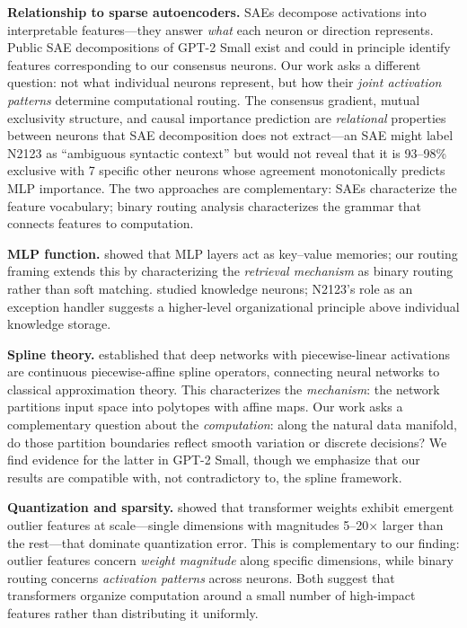 \documentclass{article}
\begin{document}
\textbf{Relationship to sparse autoencoders.}
SAEs \citep{bricken2023monosemanticity, cunningham2023sparse} decompose activations into
interpretable features---they answer \emph{what} each neuron or direction represents.
Public SAE decompositions of GPT-2 Small exist \citep{gao2024scaling, bloom2024residual}
and could in principle identify features corresponding to our consensus neurons.
Our work asks a different question: not what individual neurons represent, but how their
\emph{joint activation patterns} determine computational routing. The consensus gradient,
mutual exclusivity structure, and causal importance prediction are \emph{relational}
properties between neurons that SAE decomposition does not extract---an SAE might label
N2123 as ``ambiguous syntactic context'' but would not reveal that it is 93--98\% exclusive
with 7 specific other neurons whose agreement monotonically predicts MLP importance.
The two approaches are complementary: SAEs characterize the feature vocabulary; binary
routing analysis characterizes the grammar that connects features to computation.

\textbf{MLP function.}
\citet{geva2021transformer} showed that MLP layers act as key--value memories; our routing framing
extends this by characterizing the \emph{retrieval mechanism} as binary routing rather than
soft matching. \citet{dai2022knowledge} studied knowledge neurons; N2123's role as an exception
handler suggests a higher-level organizational principle above individual knowledge storage.

\textbf{Spline theory.}
\citet{balestriero2018spline} established that deep networks with piecewise-linear activations
are continuous piecewise-affine spline operators, connecting neural networks to classical
approximation theory. This characterizes the \emph{mechanism}: the network partitions input space
into polytopes with affine maps. Our work asks a complementary question about the
\emph{computation}: along the natural data manifold, do those partition boundaries reflect smooth
variation or discrete decisions? We find evidence for the latter in GPT-2 Small, though we
emphasize that our results are compatible with, not contradictory to, the spline framework.

\textbf{Quantization and sparsity.}
\citet{dettmers2022llmint8} showed that transformer weights exhibit emergent outlier features
at scale---single dimensions with magnitudes 5--20$\times$ larger than the rest---that
dominate quantization error. This is complementary to our finding: outlier features concern
\emph{weight magnitude} along specific dimensions, while binary routing concerns
\emph{activation patterns} across neurons. Both suggest that transformers organize computation
around a small number of high-impact features rather than distributing it uniformly.
\end{document}
